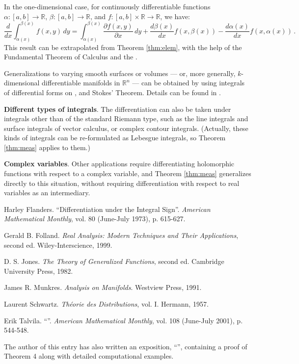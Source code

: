 \documentclass[12pt]{article}
\newcommand{\real}{\mathbb{R}}
\providecommand{\ddx}[1]{\frac{d #1}{dx}}
\providecommand{\pdx}[1]{\frac{\partial #1}{\partial x}}
\begin{document}
In the one-dimensional case,
for continuously differentiable functions
$\alpha\colon [a,b] \to \real$, $\beta\colon [a,b] \to \real$, and 
$f\colon [a,b] \times \real \to \real$, we have:
\[
\ddx{} \int_{\alpha(x)}^{\beta(x)} f(x,y) \, dy
= \int_{\alpha(x)}^{\beta(x)}
\pdx{f(x,y)} \, dy +
\frac{d\beta(x)}{dx} f(x, \beta(x)) - \frac{d\alpha(x)}{dx} f(x, \alpha(x))\,.
\] 
This result can be extrapolated from Theorem \ref{thm:elem},
with the help of the Fundamental Theorem of Calculus and
the .

Generalizations to varying smooth surfaces or volumes --- or, more generally, 
$k$-dimensional differentiable manifolds in $\real^n$ --- can be obtained
by using integrals of differential forms on ,
and Stokes' Theorem.  Details can be found in \cite{Flanders}.

\textbf{Different types of integrals}.
The differentiation can also be taken under
integrals other than of the standard Riemann type,
such as the line integrals and surface integrals of vector calculus,
or complex contour integrals.
(Actually, these kinds of integrals can be re-formulated as
Lebesgue integrals, so Theorem \ref{thm:meas} applies to them.)

\textbf{Complex variables}. 
Other applications require differentiating holomorphic functions with respect to a complex variable, and Theorem \ref{thm:meas} generalizes directly to this situation, without requiring differentiation with respect to real variables as an intermediary.


\begin{thebibliography}{XXXXXX}
Harley Flanders. ``Differentiation under the Integral Sign''.
\emph{American Mathematical Monthly}, vol. 80 (June-July 1973), p. 615-627.

Gerald B. Folland. \emph{Real Analysis: Modern Techniques and Their Applications}, second ed. Wiley-Interscience, 1999.

D. S. Jones. \emph{The Theory of Generalized Functions}, second ed.
Cambridge University Press, 1982.

James R. Munkres. \emph{Analysis on Manifolds}.
Westview Press, 1991.

Laurent Schwartz. \emph{Th\'eorie des Distributions}, vol. I.
Hermann, 1957.

Erik Talvila. ``''.
\emph{American Mathematical Monthly}, vol. 108 (June-July 2001), p. 544-548.

\end{thebibliography}

The author of this entry has also written an exposition,
``'',
containing a proof of Theorem 4 along with detailed computational examples.

\end{document}
